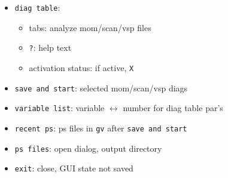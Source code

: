 \documentclass[9pt]{beamer}
\begin{document}
{\begin{frame}[fragile]
\begin{block}{}
\begin{itemize}
\item \verb|diag table|:\\
\vspace{-0.2cm}
\begin{itemize}
\item tabs: analyze mom/scan/vsp files
\item \verb|?|: help text
\item activation status: if active, \verb|X|
\end{itemize}
\vspace{-0.2cm}
\item \verb|save and start|: selected mom/scan/vsp diags
\item \verb|variable list|: variable $\leftrightarrow$ number for diag table par's
\item \verb|recent ps|: ps files in \verb|gv| after \verb|save and start|
\item \verb|ps files|: open dialog, output directory
\item \verb|exit|: close, GUI state not saved
\end{itemize}
\end{block}

\vspace{4cm}

\end{frame}
}

\end{document}
